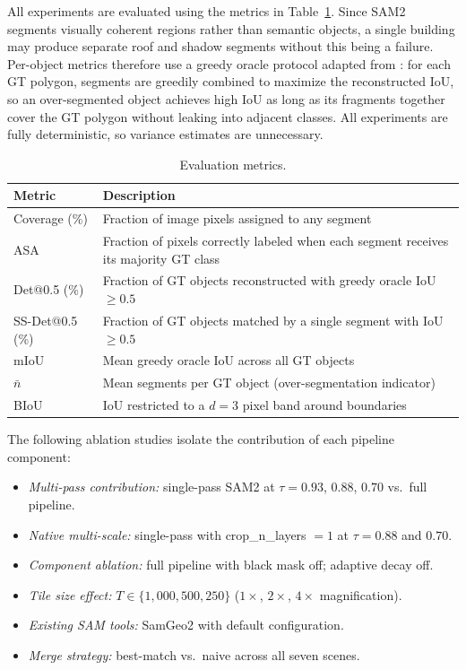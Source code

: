 \documentclass[review,11pt,authoryear]{elsarticle}
\begin{document}
\label{sec:exp_metrics} All experiments are evaluated using the metrics in Table~\ref{tab:metrics}. Since SAM2 segments visually coherent regions rather than semantic objects, a single building may produce separate roof and shadow segments without this being a failure. Per-object metrics therefore use a greedy oracle protocol adapted from \citet{clinton2010segmentation_eval}: for each GT polygon, segments are greedily combined to maximize the reconstructed IoU, so an over-segmented object achieves high IoU as long as its fragments together cover the GT polygon without leaking into adjacent classes. All experiments are fully deterministic, so variance estimates are unnecessary.

\begin{table}[htbp]
\centering
\caption{Evaluation metrics.}
\label{tab:metrics}
\scriptsize
\begin{tabular*}{\textwidth}{@{\extracolsep{\fill}}lp{11cm}}
\toprule
Metric & Description \\
\midrule
Coverage (\%) & Fraction of image pixels assigned to any segment \\
ASA \citep{stutz2018superpixels} & Fraction of pixels correctly labeled when each segment receives its majority GT class \\
Det@0.5 (\%) & Fraction of GT objects reconstructed with greedy oracle IoU $\geq 0.5$ \\
SS-Det@0.5 (\%) & Fraction of GT objects matched by a single segment with IoU $\geq 0.5$ \\
mIoU & Mean greedy oracle IoU across all GT objects \\
$\bar{n}$ & Mean segments per GT object (over-segmentation indicator) \\
BIoU \citep{cheng2021boundary} & IoU restricted to a $d = 3$ pixel band around boundaries \\
\bottomrule
\end{tabular*}
\end{table}

The following ablation studies isolate the contribution of each pipeline component:

\begin{itemize}
    \item \textit{Multi-pass contribution:} single-pass SAM2 at $\tau = 0.93$, $0.88$, $0.70$ vs.\ full pipeline.
    \item \textit{Native multi-scale:} single-pass with crop\_n\_layers $= 1$ at $\tau = 0.88$ and $0.70$.
    \item \textit{Component ablation:} full pipeline with black mask off; adaptive decay off.
    \item \textit{Tile size effect:} $T \in \{1{,}000, 500, 250\}$ ($1\times$, $2\times$, $4\times$ magnification).
    \item \textit{Existing SAM tools:} SamGeo2 \citep{wu2023samgeo} with default configuration.
    \item \textit{Merge strategy:} best-match vs.\ naive across all seven scenes.
\end{itemize}
\end{document}
